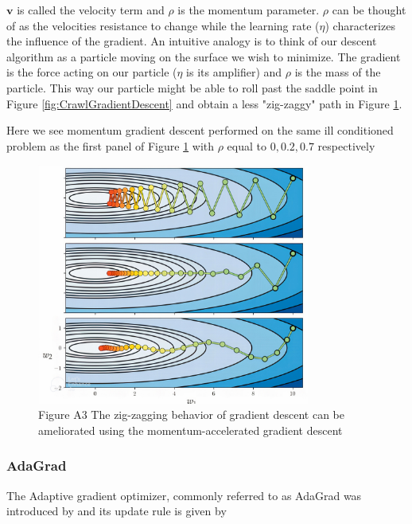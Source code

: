\documentclass{article}
\begin{document}
$\mathbf{v}$ is called the velocity term and $\rho$ is the momentum parameter. $\rho$ can be thought of as the velocities resistance to change while the learning rate ($\eta$) characterizes the influence of the gradient. An intuitive analogy is to think of our descent algorithm as a particle moving on the surface we wish to minimize. The gradient is the force acting on our particle ($\eta$ is its amplifier) and $\rho$ is the mass of the particle. This way our particle might be able to roll past the saddle point in Figure \ref{fig:CrawlGradientDescent} and obtain a less "zig-zaggy" path in Figure \ref{fig:ZigZagMomentumGradientDescent}.

\newpage

Here we see momentum gradient descent performed on the same ill conditioned problem as the first panel of Figure \ref{fig:ZigZagMomentumGradientDescent} with $\rho$ equal to $0, 0.2, 0.7$ respectively

\begin{figure}[H]
    \centering
    \includegraphics[width=0.8\textwidth]{Project2/figures/momentum_based_gradient_descent_less_zig.jpg.jpg}
    \caption{Figure A3 \cite[p.~478]{MLRefined} The zig-zagging behavior of gradient
descent can be ameliorated using the momentum-accelerated gradient descent}
    \label{fig:ZigZagMomentumGradientDescent}
\end{figure}


\subsubsection{AdaGrad}
The Adaptive gradient optimizer, commonly referred to as AdaGrad was introduced by \cite{duchi2011adaptive} and its update rule is given by
\end{document}
